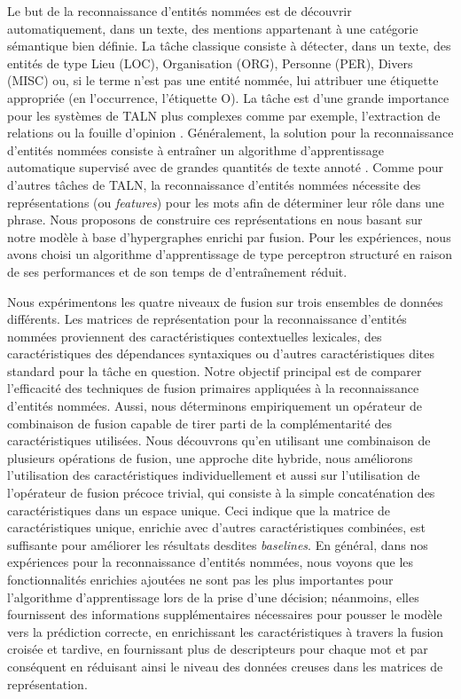 \documentclass[a4paper,11pt,twoside]{article}
\begin{document}
Le but de la reconnaissance d'entités nommées est de découvrir automatiquement, dans un texte, des mentions appartenant à une catégorie sémantique bien définie. La tâche classique consiste à détecter, dans un texte, des entités de type Lieu (LOC), Organisation (ORG), Personne (PER), Divers (MISC) ou, si le terme n'est pas une entité nommée, lui attribuer une étiquette appropriée (en l'occurrence, l'étiquette O). La tâche est d'une grande importance pour les systèmes de TALN plus complexes comme par exemple, l'extraction de relations ou la fouille d'opinion \cite{nadeau2007survey}. Généralement, la solution pour la reconnaissance d'entités nommées consiste à entraîner un algorithme d'apprentissage automatique supervisé avec de grandes quantités de texte annoté \cite{mining12Book}. Comme pour d'autres tâches de TALN, la reconnaissance d'entités nommées nécessite des représentations (ou \textit{features}) pour les mots afin de déterminer leur rôle dans une phrase. Nous proposons de construire ces représentations en nous basant sur notre modèle à base d'hypergraphes enrichi par fusion. Pour les expériences, nous avons choisi un algorithme d'apprentissage de type perceptron structuré en raison de ses performances et de son temps de d'entraînement réduit.

Nous expérimentons les quatre niveaux de fusion sur trois ensembles de données différents. Les matrices de représentation pour la reconnaissance d'entités nommées proviennent des caractéristiques contextuelles lexicales, des caractéristiques des dépendances syntaxiques ou d'autres caractéristiques dites standard pour la tâche en question. Notre objectif principal est de comparer l'efficacité des techniques de fusion primaires appliquées à la reconnaissance d'entités nommées. Aussi, nous déterminons empiriquement un opérateur de combinaison de fusion capable de tirer parti de la complémentarité des caractéristiques utilisées.
%
Nous découvrons qu'en utilisant une combinaison de plusieurs opérations de fusion, une approche dite hybride, nous améliorons l'utilisation des caractéristiques individuellement et aussi sur l'utilisation de l'opérateur de fusion précoce trivial, qui consiste à la simple concaténation des caractéristiques dans un espace unique. Ceci indique que la matrice de caractéristiques unique, enrichie avec d'autres caractéristiques combinées, est suffisante pour améliorer les résultats desdites \textit{baselines}. En général, dans nos expériences pour la reconnaissance d'entités nommées, nous voyons que les fonctionnalités enrichies ajoutées ne sont pas les plus importantes pour l'algorithme d'apprentissage lors de la prise d'une décision; néanmoins, elles fournissent des informations supplémentaires nécessaires pour pousser le modèle vers la prédiction correcte, en enrichissant les caractéristiques à travers la fusion croisée et tardive, en fournissant plus de descripteurs pour chaque mot et par conséquent en réduisant ainsi le niveau des données creuses dans les matrices de représentation.
\end{document}
